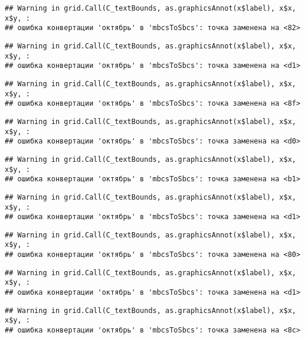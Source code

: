 \documentclass[
]{article}
\begin{document}
\begin{verbatim}
## Warning in grid.Call(C_textBounds, as.graphicsAnnot(x$label), x$x, x$y, :
## ошибка конвертации 'октябрь' в 'mbcsToSbcs': точка заменена на <82>
\end{verbatim}

\begin{verbatim}
## Warning in grid.Call(C_textBounds, as.graphicsAnnot(x$label), x$x, x$y, :
## ошибка конвертации 'октябрь' в 'mbcsToSbcs': точка заменена на <d1>
\end{verbatim}

\begin{verbatim}
## Warning in grid.Call(C_textBounds, as.graphicsAnnot(x$label), x$x, x$y, :
## ошибка конвертации 'октябрь' в 'mbcsToSbcs': точка заменена на <8f>
\end{verbatim}

\begin{verbatim}
## Warning in grid.Call(C_textBounds, as.graphicsAnnot(x$label), x$x, x$y, :
## ошибка конвертации 'октябрь' в 'mbcsToSbcs': точка заменена на <d0>
\end{verbatim}

\begin{verbatim}
## Warning in grid.Call(C_textBounds, as.graphicsAnnot(x$label), x$x, x$y, :
## ошибка конвертации 'октябрь' в 'mbcsToSbcs': точка заменена на <b1>
\end{verbatim}

\begin{verbatim}
## Warning in grid.Call(C_textBounds, as.graphicsAnnot(x$label), x$x, x$y, :
## ошибка конвертации 'октябрь' в 'mbcsToSbcs': точка заменена на <d1>
\end{verbatim}

\begin{verbatim}
## Warning in grid.Call(C_textBounds, as.graphicsAnnot(x$label), x$x, x$y, :
## ошибка конвертации 'октябрь' в 'mbcsToSbcs': точка заменена на <80>
\end{verbatim}

\begin{verbatim}
## Warning in grid.Call(C_textBounds, as.graphicsAnnot(x$label), x$x, x$y, :
## ошибка конвертации 'октябрь' в 'mbcsToSbcs': точка заменена на <d1>
\end{verbatim}

\begin{verbatim}
## Warning in grid.Call(C_textBounds, as.graphicsAnnot(x$label), x$x, x$y, :
## ошибка конвертации 'октябрь' в 'mbcsToSbcs': точка заменена на <8c>
\end{verbatim}
\end{document}
